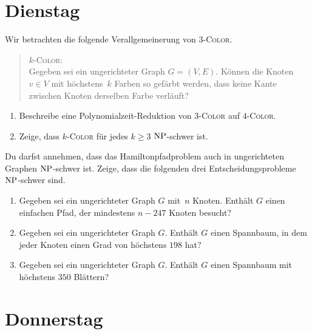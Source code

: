 \documentclass{uebung_cs}
\begin{document}
\section*{Dienstag}

\begin{exercise}[Färbbarkeit]
    Wir betrachten die folgende Verallgemeinerung von $3$-\textsc{Color}.
	\begin{quote}
		$k$-\textsc{Color}:\\
		Gegeben sei ein ungerichteter Graph $G = (V,E)$. Können die Knoten $v \in V$ mit höchstens~$k$ Farben so gefärbt werden, dass keine Kante zwischen Knoten derselben Farbe verläuft?
	\end{quote}
	\begin{enumerate}
		\item\mittel Beschreibe eine Polynomialzeit-Reduktion von $3$-\textsc{Color} auf $4$-\textsc{Color}.
		\item\mittel Zeige, dass $k$-\textsc{Color} für jedes $k \geq 3$ $\mathrm{NP}$-schwer ist.
	\end{enumerate}
\end{exercise}

\begin{exercise}[Pfade und Spannbäume]
	Du darfst annehmen, dass das Hamiltonpfadproblem auch in ungerichteten Graphen $\mathrm{NP}$-schwer ist.
	Zeige, dass die folgenden drei Entscheidungsprobleme $\mathrm{NP}$-schwer sind.
	\begin{enumerate}
		\item\mittel Gegeben sei ein ungerichteter Graph $G$ mit~$n$ Knoten. Enthält $G$ einen einfachen Pfad, der mindestens $n-247$ Knoten besucht?
		\item\mittel Gegeben sei ein ungerichteter Graph $G$. Enthält $G$ einen Spannbaum, in dem jeder Knoten einen Grad von höchstens $198$ hat?
		\item\mittel Gegeben sei ein ungerichteter Graph $G$. Enthält $G$ einen Spannbaum mit höchstens $350$ Blättern?
	\end{enumerate}
\end{exercise}

\section*{Donnerstag}
\end{document}
